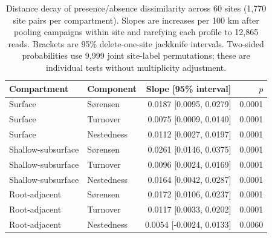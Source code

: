 \begin{table}[htbp]\centering\small
\caption{Distance decay of presence/absence dissimilarity across 60 sites (1,770 site pairs per compartment). Slopes are increases per 100 km after pooling campaigns within site and rarefying each profile to 12,865 reads. Brackets are 95\% delete-one-site jackknife intervals. Two-sided probabilities use 9,999 joint site-label permutations; these are individual tests without multiplicity adjustment.}
\label{tab:turnover-slopes}
\begin{tabular}{llrr}\toprule
Compartment & Component & Slope [95\% interval] & $p$ \\\midrule
Surface & S\o{}rensen & 0.0187 [0.0095, 0.0279] & 0.0001 \\
Surface & Turnover & 0.0075 [0.0009, 0.0140] & 0.0001 \\
Surface & Nestedness & 0.0112 [0.0027, 0.0197] & 0.0001 \\
Shallow-subsurface & S\o{}rensen & 0.0261 [0.0146, 0.0375] & 0.0001 \\
Shallow-subsurface & Turnover & 0.0096 [0.0024, 0.0169] & 0.0001 \\
Shallow-subsurface & Nestedness & 0.0164 [0.0042, 0.0287] & 0.0001 \\
Root-adjacent & S\o{}rensen & 0.0172 [0.0106, 0.0237] & 0.0001 \\
Root-adjacent & Turnover & 0.0117 [0.0033, 0.0202] & 0.0001 \\
Root-adjacent & Nestedness & 0.0054 [-0.0024, 0.0133] & 0.0060 \\
\bottomrule\end{tabular}\end{table}
